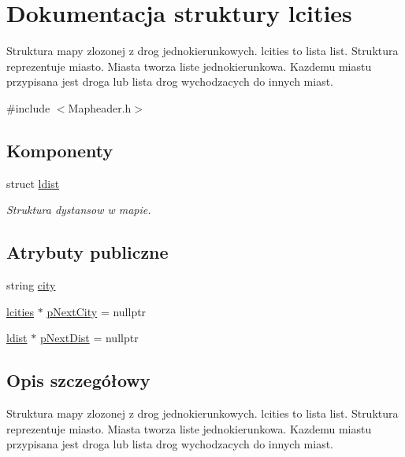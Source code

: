 \hypertarget{structlcities}{}\section{Dokumentacja struktury lcities}
\label{structlcities}


Struktura mapy zlozonej z drog jednokierunkowych. lcities to lista list. Struktura reprezentuje miasto. Miasta tworza liste jednokierunkowa. Kazdemu miastu przypisana jest droga lub lista drog wychodzacych do innych miast.  




{\ttfamily \#include $<$Mapheader.\+h$>$}

\subsection*{Komponenty}
\begin{DoxyCompactItemize}
\item 
struct \mbox{\hyperlink{structlcities_1_1ldist}{ldist}}
\begin{DoxyCompactList}\small\item\em Struktura dystansow w mapie. \end{DoxyCompactList}\end{DoxyCompactItemize}
\subsection*{Atrybuty publiczne}
\begin{DoxyCompactItemize}
\item 
string \mbox{\hyperlink{structlcities_ab7fec18ea0ddc46480007d8eaf327a0f}{city}}
\item 
\mbox{\hyperlink{structlcities}{lcities}} $\ast$ \mbox{\hyperlink{structlcities_a04f15fa0285017666a64233b9aad441d}{p\+Next\+City}} = nullptr
\item 
\mbox{\hyperlink{structlcities_1_1ldist}{ldist}} $\ast$ \mbox{\hyperlink{structlcities_a2415f938e641bf7b0075f98132802c9c}{p\+Next\+Dist}} = nullptr
\end{DoxyCompactItemize}


\subsection{Opis szczegółowy}
Struktura mapy zlozonej z drog jednokierunkowych. lcities to lista list. Struktura reprezentuje miasto. Miasta tworza liste jednokierunkowa. Kazdemu miastu przypisana jest droga lub lista drog wychodzacych do innych miast. 

